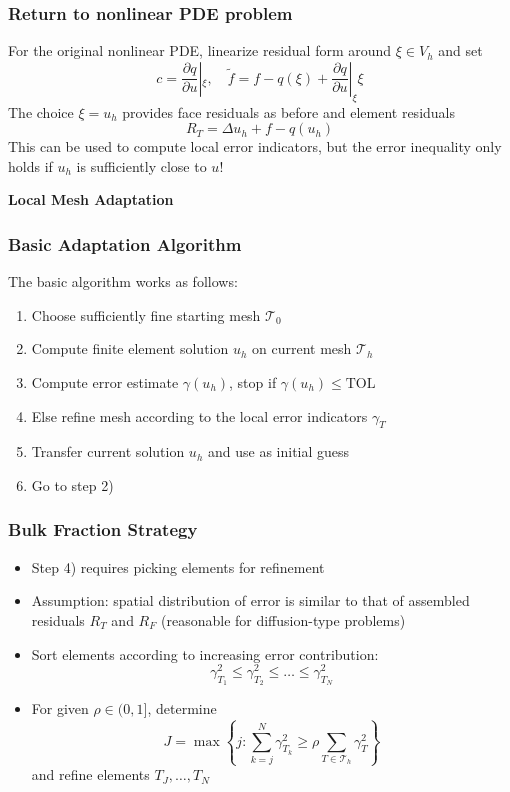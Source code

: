 \documentclass[aspectratio=169,11pt]{beamer}
\theoremstyle{definition}
\begin{document}
\begin{frame}
\frametitle{Return to nonlinear PDE problem}
For the original nonlinear PDE, linearize residual form around $\xi \in V_h$ and set
\begin{equation*}
  c = \frac{\partial q}{\partial u} |_\xi, \quad \tilde{f} = f - q(\xi) + \frac{\partial q}{\partial u} |_\xi \xi
\end{equation*}
The choice $\xi = u_h$ provides face residuals as before and element residuals
\begin{equation*}
  R_T = \Delta u_h + f - q(u_h)
\end{equation*}
This can be used to compute local error indicators, but the error inequality only
holds if $u_h$ is sufficiently close to $u$!
\end{frame}

\begin{frame}
\begin{center}
\Large\textbf{Local Mesh Adaptation}
\end{center}
\end{frame}

\begin{frame}
\frametitle{Basic Adaptation Algorithm}
The basic algorithm works as follows:
\begin{enumerate}
  \item Choose sufficiently fine starting mesh $\mathcal{T}_0$
  \item Compute finite element solution $u_h$ on current mesh $\mathcal{T}_h$
  \item Compute error estimate $\gamma(u_h)$, stop if $\gamma(u_h) \leq \text{TOL}$
  \item Else refine mesh according to the local error indicators $\gamma_T$
  \item Transfer current solution $u_h$ and use as initial guess
  \item Go to step 2)
\end{enumerate}
\end{frame}

\begin{frame}
\frametitle{Bulk Fraction Strategy}
\begin{itemize}
  \item Step 4) requires picking elements for refinement
  \item Assumption: spatial distribution of error is similar to that of
    assembled residuals $R_T$ and $R_F$ (reasonable for diffusion-type
    problems)
  \item Sort elements according to increasing error contribution:
    \begin{equation*}
      \gamma_{T_1}^2 \leq \gamma_{T_2}^2 \leq \dots \leq \gamma_{T_N}^2
    \end{equation*}
  \item For given $\rho \in (0,1]$, determine
    \begin{equation*}
      J = \max \left\{ j \colon \sum_{k=j}^N \gamma_{T_k}^2 \geq \rho \sum_{T \in \mathcal{T}_h} \gamma_T^2 \right\}
    \end{equation*}
    and refine elements $T_J,\dots,T_N$
\end{itemize}
\end{frame}
\end{document}
